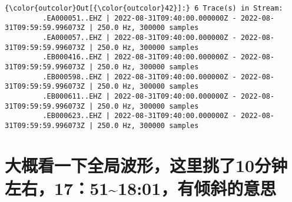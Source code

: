 \documentclass[11pt]{article}
\begin{document}
\begin{Verbatim}[commandchars=\\\{\}]
{\color{outcolor}Out[{\color{outcolor}42}]:} 6 Trace(s) in Stream:
         .EA000051..EHZ | 2022-08-31T09:40:00.000000Z - 2022-08-31T09:59:59.996073Z | 250.0 Hz, 300000 samples
         .EA000057..EHZ | 2022-08-31T09:40:00.000000Z - 2022-08-31T09:59:59.996073Z | 250.0 Hz, 300000 samples
         .EB000416..EHZ | 2022-08-31T09:40:00.000000Z - 2022-08-31T09:59:59.996073Z | 250.0 Hz, 300000 samples
         .EB000598..EHZ | 2022-08-31T09:40:00.000000Z - 2022-08-31T09:59:59.996073Z | 250.0 Hz, 300000 samples
         .EB000611..EHZ | 2022-08-31T09:40:00.000000Z - 2022-08-31T09:59:59.996073Z | 250.0 Hz, 300000 samples
         .EB000623..EHZ | 2022-08-31T09:40:00.000000Z - 2022-08-31T09:59:59.996073Z | 250.0 Hz, 300000 samples
\end{Verbatim}
            
    \section{大概看一下全局波形，这里挑了10分钟左右，17：51\textasciitilde{}18:01，有倾斜的意思}\label{ux5927ux6982ux770bux4e00ux4e0bux5168ux5c40ux6ce2ux5f62ux8fd9ux91ccux6311ux4e8610ux5206ux949fux5de6ux53f317511801ux6709ux503eux659cux7684ux610fux601d}
\end{document}
